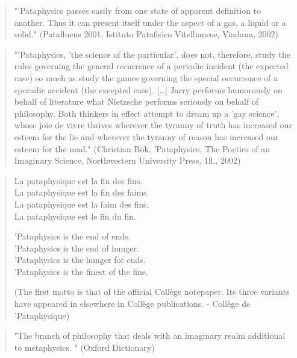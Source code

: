 \begin{quote}
  "'Pataphysics passes easily from one state of apparent definition to another. Thus it can present itself under the aspect of a gas, a liquid or a solid." (Patafluens 2001, Istituto Patafisico Vitellianese, Viadana, 2002) \citep{Brotchie2003}
\end{quote}

\begin{quote}
  "'Pataphysics, 'the science of the particular', does not, therefore, study the rules governing the general recurrence of a periodic incident (the expected case) so much as study the games governing the special occurrence of a sporadic accident (the excepted case). […] Jarry performs humorously on behalf of literature what Nietzsche performs seriously on behalf of philosophy. Both thinkers in effect attempt to dream up a 'gay science', whose joie de vivre thrives wherever the tyranny of truth has increased our esteem for the lie and wherever the tyranny of reason has increased our esteem for the mad." (Christian Bök, 'Pataphysics, The Poetics of an Imaginary Science, Northwestern University Press, 1ll., 2002) \citep{Bok2002}
\end{quote}

\begin{quote}
  \begin{multicols}{2}
  La pataphysique est la fin des fins.\\
  La pataphysique est la fin des faims.\\
  La pataphysique est la faim des fins.\\
  La pataphysique est le fin du fin.
  \par \vfill \columnbreak
  \begin{flushright}
  'Pataphysics is the end of ends.\\
  'Pataphysics is the end of hunger.\\
  'Pataphysics is the hunger for ends.\\
  'Pataphysics is the finest of the fine.
  \end{flushright}
  \end{multicols}
  (The first motto is that of the official Collège notepaper. Its three variants have appeared in elsewhere in Collège publications. - Collège de 'Pataphysique) \citep{Brotchie2003}
\end{quote}

\begin{quote}
  "The branch of philosophy that deals with an imaginary realm additional to metaphysics. " (Oxford Dictionary)
\end{quote}

